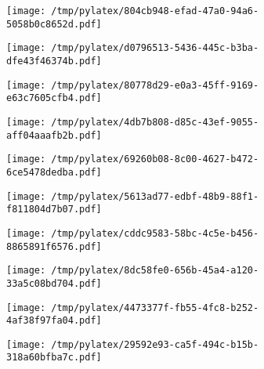 \documentclass{article}
\begin{document}
\begin{figure}[htbp]
\begin{subfigure}[b]{.3\linewidth}
\texttt{[image: /tmp/pylatex/804cb948-efad-47a0-94a6-5058b0c8652d.pdf]}
\end{subfigure}
\begin{subfigure}[b]{.3\linewidth}
\texttt{[image: /tmp/pylatex/d0796513-5436-445c-b3ba-dfe43f46374b.pdf]}
\end{subfigure}
\begin{subfigure}[b]{.3\linewidth}
\texttt{[image: /tmp/pylatex/80778d29-e0a3-45ff-9169-e63c7605cfb4.pdf]}
\end{subfigure}
\begin{subfigure}[b]{.3\linewidth}
\texttt{[image: /tmp/pylatex/4db7b808-d85c-43ef-9055-aff04aaafb2b.pdf]}
\end{subfigure}
\begin{subfigure}[b]{.3\linewidth}
\texttt{[image: /tmp/pylatex/69260b08-8c00-4627-b472-6ce5478dedba.pdf]}
\end{subfigure}
\begin{subfigure}[b]{.3\linewidth}
\texttt{[image: /tmp/pylatex/5613ad77-edbf-48b9-88f1-f811804d7b07.pdf]}
\end{subfigure}
\begin{subfigure}[b]{.3\linewidth}
\texttt{[image: /tmp/pylatex/cddc9583-58bc-4c5e-b456-8865891f6576.pdf]}
\end{subfigure}
\begin{subfigure}[b]{.3\linewidth}
\texttt{[image: /tmp/pylatex/8dc58fe0-656b-45a4-a120-33a5c08bd704.pdf]}
\end{subfigure}
\begin{subfigure}[b]{.3\linewidth}
\texttt{[image: /tmp/pylatex/4473377f-fb55-4fc8-b252-4af38f97fa04.pdf]}
\end{subfigure}
\begin{subfigure}[b]{.3\linewidth}
\texttt{[image: /tmp/pylatex/29592e93-ca5f-494c-b15b-318a60bfba7c.pdf]}
\end{subfigure}
\end{figure}
\end{document}
